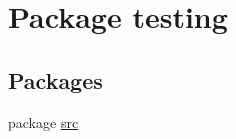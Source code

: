 \hypertarget{namespacetesting}{\section{Package testing}
\label{namespacetesting}
}
\subsection*{Packages}
\begin{DoxyCompactItemize}
\item 
package \hyperlink{namespacetesting_1_1src}{src}
\end{DoxyCompactItemize}

